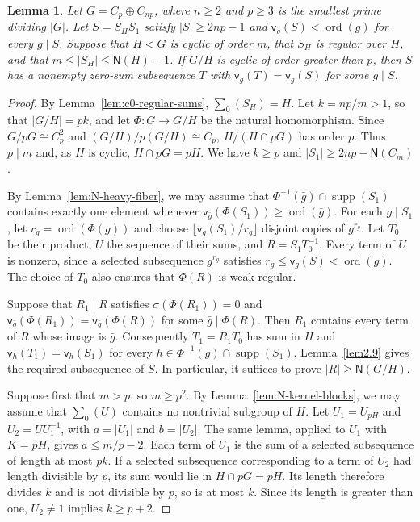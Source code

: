 \documentclass[10pt,reqno]{amsart}
\newtheorem{lem}[thm]{Lemma}
\theoremstyle{definition}
\theoremstyle{remark}
\numberwithin{equation}{section}
\DeclareMathOperator{\ord}{ord}
\DeclareMathOperator{\supp}{supp}
\begin{document}
\begin{lem}\label{lem:N-cyclic-quotient}
Let $G=C_p\oplus C_{np}$, where $n\ge2$ and $p\ge3$ is the
smallest prime dividing $|G|$.
Let $S=S_HS_1$ satisfy $|S|\ge2np-1$ and
$\mathsf v_g(S)<\ord(g)$ for every $g\mid S$.
Suppose that $H<G$ is cyclic of order $m$, that $S_H$ is regular over $H$,
and that $m\le|S_H|\le\mathsf N(H)-1$.
If $G/H$ is cyclic of order greater than $p$, then $S$ has a nonempty
zero-sum subsequence $T$ with $\mathsf v_g(T)=\mathsf v_g(S)$
for some $g\mid S$.
\end{lem}
\begin{proof}
By Lemma~\ref{lem:c0-regular-sums}, $\sum_0(S_H)=H$.
Let $k=np/m>1$, so that $|G/H|=pk$, and let $\Phi:G\to G/H$
be the natural homomorphism.
Since $G/pG\cong C_p^2$ and $(G/H)/p(G/H)\cong C_p$,
$H/(H\cap pG)$ has order $p$. Thus $p\mid m$ and,
as $H$ is cyclic, $H\cap pG=pH$.
We have $k\ge p$ and $|S_1|\ge2np-\mathsf N(C_m)$.

By Lemma~\ref{lem:N-heavy-fiber}, we may assume that
$\Phi^{-1}(\bar g)\cap\supp(S_1)$ contains exactly one element whenever
$\mathsf v_{\bar g}(\Phi(S_1))\ge\ord(\bar g)$.
For each $g\mid S_1$, let $r_g=\ord(\Phi(g))$ and choose
$\lfloor\mathsf v_g(S_1)/r_g\rfloor$ disjoint copies of $g^{r_g}$.
Let $T_0$ be their product, $U$ the sequence of their sums, and
$R=S_1T_0^{-1}$.
Every term of $U$ is nonzero, since a selected subsequence $g^{r_g}$
satisfies $r_g\le\mathsf v_g(S)<\ord(g)$.
The choice of $T_0$ also ensures that $\Phi(R)$ is weak-regular.

Suppose that $R_1\mid R$ satisfies $\sigma(\Phi(R_1))=0$ and
$\mathsf v_{\bar g}(\Phi(R_1))=\mathsf v_{\bar g}(\Phi(R))$
for some $\bar g\mid\Phi(R)$.
Then $R_1$ contains every term of $R$ whose image is $\bar g$.
Consequently $T_1=R_1T_0$ has sum in $H$ and
$\mathsf v_h(T_1)=\mathsf v_h(S_1)$ for every
$h\in\Phi^{-1}(\bar g)\cap\supp(S_1)$.
Lemma~\ref{lem2.9} gives the required subsequence of $S$.
In particular, it suffices to prove $|R|\ge\mathsf N(G/H)$.

Suppose first that $m>p$, so $m\ge p^2$.
By Lemma~\ref{lem:N-kernel-blocks}, we may assume that $\sum_0(U)$
contains no nontrivial subgroup of $H$.
Let $U_1=U_{pH}$ and $U_2=UU_1^{-1}$, with $a=|U_1|$ and $b=|U_2|$.
The same lemma, applied to $U_1$ with $K=pH$, gives $a\le m/p-2$.
Each term of $U_1$ is the sum of a selected subsequence of length at most $pk$.
If a selected subsequence corresponding to a term of $U_2$ had length
divisible by $p$, its sum would lie in $H\cap pG=pH$.
Its length therefore divides $k$ and is not divisible by $p$, so is at most $k$.
Since its length is greater than one, $U_2\ne1$ implies $k\ge p+2$.


\end{proof}
\end{document}

